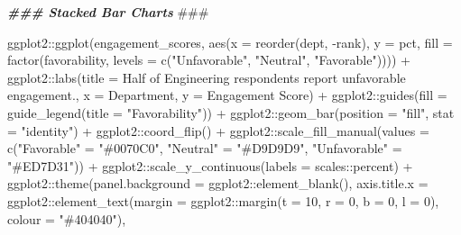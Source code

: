 \documentclass[
]{book}
\newenvironment{Shaded}{\begin{snugshade}}{\end{snugshade}}
\newcommand{\AlertTok}[1]{\textcolor[rgb]{0.94,0.16,0.16}{#1}}
\newcommand{\AttributeTok}[1]{\textcolor[rgb]{0.77,0.63,0.00}{#1}}
\newcommand{\DecValTok}[1]{\textcolor[rgb]{0.00,0.00,0.81}{#1}}
\newcommand{\DocumentationTok}[1]{\textcolor[rgb]{0.56,0.35,0.01}{\textbf{\textit{#1}}}}
\newcommand{\FunctionTok}[1]{\textcolor[rgb]{0.00,0.00,0.00}{#1}}
\newcommand{\NormalTok}[1]{#1}
\newcommand{\OtherTok}[1]{\textcolor[rgb]{0.56,0.35,0.01}{#1}}
\newcommand{\SpecialCharTok}[1]{\textcolor[rgb]{0.00,0.00,0.00}{#1}}
\newcommand{\StringTok}[1]{\textcolor[rgb]{0.31,0.60,0.02}{#1}}
\begin{document}
\begin{Shaded}
\begin{Highlighting}[]
\DocumentationTok{\#\#\# Stacked Bar Charts }\AlertTok{\#\#\#}

\NormalTok{ggplot2}\SpecialCharTok{::}\FunctionTok{ggplot}\NormalTok{(engagement\_scores, }\FunctionTok{aes}\NormalTok{(}\AttributeTok{x =} \FunctionTok{reorder}\NormalTok{(dept, }\SpecialCharTok{{-}}\NormalTok{rank), }\AttributeTok{y =}\NormalTok{ pct, }\AttributeTok{fill =} \FunctionTok{factor}\NormalTok{(favorability, }\AttributeTok{levels =} \FunctionTok{c}\NormalTok{(}\StringTok{"Unfavorable"}\NormalTok{, }\StringTok{"Neutral"}\NormalTok{, }\StringTok{"Favorable"}\NormalTok{)))) }\SpecialCharTok{+}
\NormalTok{ggplot2}\SpecialCharTok{::}\FunctionTok{labs}\NormalTok{(}\AttributeTok{title =} \StringTok{\textquotesingle{}Half of Engineering respondents report unfavorable engagement.\textquotesingle{}}\NormalTok{, }\AttributeTok{x =} \StringTok{\textquotesingle{}Department\textquotesingle{}}\NormalTok{, }\AttributeTok{y =} \StringTok{\textquotesingle{}Engagement Score\textquotesingle{}}\NormalTok{) }\SpecialCharTok{+}
\NormalTok{ggplot2}\SpecialCharTok{::}\FunctionTok{guides}\NormalTok{(}\AttributeTok{fill =} \FunctionTok{guide\_legend}\NormalTok{(}\AttributeTok{title =} \StringTok{"Favorability"}\NormalTok{)) }\SpecialCharTok{+}
\NormalTok{ggplot2}\SpecialCharTok{::}\FunctionTok{geom\_bar}\NormalTok{(}\AttributeTok{position =} \StringTok{"fill"}\NormalTok{, }\AttributeTok{stat =} \StringTok{"identity"}\NormalTok{) }\SpecialCharTok{+}
\NormalTok{ggplot2}\SpecialCharTok{::}\FunctionTok{coord\_flip}\NormalTok{() }\SpecialCharTok{+}
\NormalTok{ggplot2}\SpecialCharTok{::}\FunctionTok{scale\_fill\_manual}\NormalTok{(}\AttributeTok{values =} \FunctionTok{c}\NormalTok{(}\StringTok{"Favorable"} \OtherTok{=} \StringTok{"\#0070C0"}\NormalTok{,}
                                      \StringTok{"Neutral"} \OtherTok{=} \StringTok{"\#D9D9D9"}\NormalTok{,}
                                      \StringTok{"Unfavorable"} \OtherTok{=} \StringTok{"\#ED7D31"}\NormalTok{)) }\SpecialCharTok{+}
\NormalTok{ggplot2}\SpecialCharTok{::}\FunctionTok{scale\_y\_continuous}\NormalTok{(}\AttributeTok{labels =}\NormalTok{ scales}\SpecialCharTok{::}\NormalTok{percent) }\SpecialCharTok{+}
\NormalTok{ggplot2}\SpecialCharTok{::}\FunctionTok{theme}\NormalTok{(}\AttributeTok{panel.background =}\NormalTok{ ggplot2}\SpecialCharTok{::}\FunctionTok{element\_blank}\NormalTok{(),}
               \AttributeTok{axis.title.x =}\NormalTok{ ggplot2}\SpecialCharTok{::}\FunctionTok{element\_text}\NormalTok{(}\AttributeTok{margin =}\NormalTok{ ggplot2}\SpecialCharTok{::}\FunctionTok{margin}\NormalTok{(}\AttributeTok{t =} \DecValTok{10}\NormalTok{, }\AttributeTok{r =} \DecValTok{0}\NormalTok{, }\AttributeTok{b =} \DecValTok{0}\NormalTok{, }\AttributeTok{l =} \DecValTok{0}\NormalTok{), }\AttributeTok{colour =} \StringTok{"\#404040"}\NormalTok{),}

\end{Highlighting}
\end{Shaded}
\end{document}
